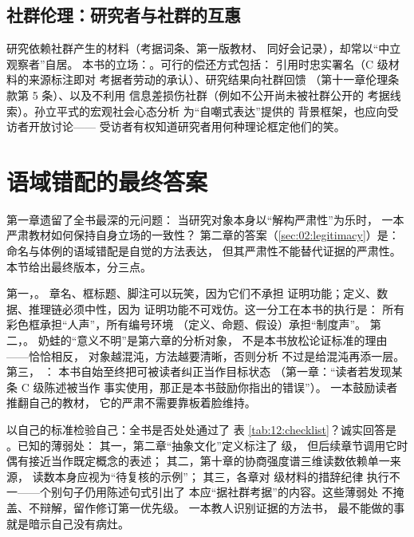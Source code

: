 \subsection{社群伦理：研究者与社群的互惠}

研究依赖社群产生的材料（考据词条、第一版教材、
同好会记录），却常以“中立观察者”自居。
本书的立场：。可行的偿还方式包括：
引用时忠实署名（C 级材料的来源标注即对
考据者劳动的承认）、研究结果向社群回馈
（第十一章伦理条款第 5 条）、以及不利用
信息差损伤社群（例如不公开尚未被社群公开的
考据线索）。孙立平式的宏观社会心态分析
\cite{sunliping2010} 为“自嘲式表达”提供的
背景框架，也应向受访者开放讨论——
受访者有权知道研究者用何种理论框定他们的笑。

\section{语域错配的最终答案}\label{sec:12:register}

第一章遗留了全书最深的元问题：
当研究对象本身以“解构严肃性”为乐时，
一本严肃教材如何保持自身立场的一致性？
第二章的答案（\ref{sec:02:legitimacy}）是：
命名与体例的语域错配是自觉的方法表达，
但其严肃性不能替代证据的严肃性。
本节给出最终版本，分三点。

第一，。
章名、框标题、脚注可以玩笑，因为它们不承担
证明功能；定义、数据、推理链必须中性，因为
证明功能不可戏仿。这一分工在本书的执行是：
所有彩色框承担“人声”，所有编号环境
（定义、命题、假设）承担“制度声”。
第二，。
奶蛙的“意义不明”是第六章的分析对象，
不是本书放松论证标准的理由——恰恰相反，
对象越混沌，方法越要清晰，否则分析
不过是给混沌再添一层。第三，
：
本书自始至终把可被读者纠正当作目标状态
（第一章：“读者若发现某条 C 级陈述被当作
事实使用，那正是本书鼓励你指出的错误”）。
一本鼓励读者推翻自己的教材，
它的严肃不需要靠板着脸维持。

\begin{nlcritique}
  以自己的标准检验自己：全书是否处处通过了
  表 \ref{tab:12:checklist}？诚实回答是
  。已知的薄弱处：
  其一，第二章“抽象文化”定义标注了  级，
  但后续章节调用它时偶有接近当作既定概念的表述；
  其二，第十章的协商强度谱三维读数依赖单一来源，
  读数本身应视为“待复核的示例”；
  其三，各章对  级材料的措辞纪律
  执行不一——个别句子仍用陈述句式引出了
  本应“据社群考据”的内容。这些薄弱处
  不掩盖、不辩解，留作修订第一优先级。
  一本教人识别证据的方法书，
  最不能做的事就是暗示自己没有病灶。
\end{nlcritique}

